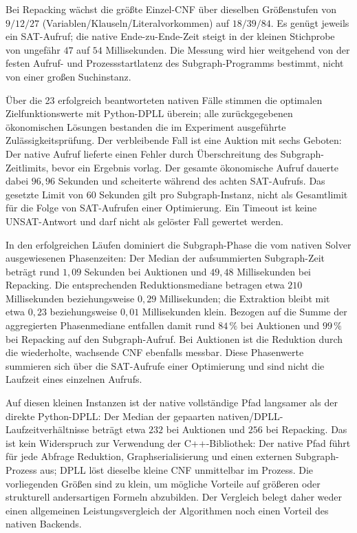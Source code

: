 \documentclass[a4paper,12pt]{article}
\theoremstyle{definition}
\begin{document}
Bei Repacking wächst die größte Einzel-CNF über dieselben Größenstufen von \(9/12/27\) (Variablen/Klauseln/Literalvorkommen) auf \(18/39/84\). Es genügt jeweils ein SAT-Aufruf; die native Ende-zu-Ende-Zeit steigt in der kleinen Stichprobe von ungefähr \(47\) auf \(54\) Millisekunden. Die Messung wird hier weitgehend von der festen Aufruf- und Prozessstartlatenz des Subgraph-Programms bestimmt, nicht von einer großen Suchinstanz.

Über die 23 erfolgreich beantworteten nativen Fälle stimmen die optimalen Zielfunktionswerte mit Python-DPLL überein; alle zurückgegebenen ökonomischen Lösungen bestanden die im Experiment ausgeführte Zulässigkeitsprüfung. Der verbleibende Fall ist eine Auktion mit sechs Geboten: Der native Aufruf lieferte einen Fehler durch Überschreitung des Subgraph-Zeitlimits, bevor ein Ergebnis vorlag. Der gesamte ökonomische Aufruf dauerte dabei \(96{,}96\) Sekunden und scheiterte während des achten SAT-Aufrufs. Das gesetzte Limit von 60 Sekunden gilt pro Subgraph-Instanz, nicht als Gesamtlimit für die Folge von SAT-Aufrufen einer Optimierung. Ein Timeout ist keine UNSAT-Antwort und darf nicht als gelöster Fall gewertet werden.

In den erfolgreichen Läufen dominiert die Subgraph-Phase die vom nativen Solver ausgewiesenen Phasenzeiten: Der Median der aufsummierten Subgraph-Zeit beträgt rund \(1{,}09\) Sekunden bei Auktionen und \(49{,}48\) Millisekunden bei Repacking. Die entsprechenden Reduktionsmediane betragen etwa \(210\) Millisekunden beziehungsweise \(0{,}29\) Millisekunden; die Extraktion bleibt mit etwa \(0{,}23\) beziehungsweise \(0{,}01\) Millisekunden klein. Bezogen auf die Summe der aggregierten Phasenmediane entfallen damit rund \(84\,\%\) bei Auktionen und \(99\,\%\) bei Repacking auf den Subgraph-Aufruf. Bei Auktionen ist die Reduktion durch die wiederholte, wachsende CNF ebenfalls messbar. Diese Phasenwerte summieren sich über die SAT-Aufrufe einer Optimierung und sind nicht die Laufzeit eines einzelnen Aufrufs.

Auf diesen kleinen Instanzen ist der native vollständige Pfad langsamer als der direkte Python-DPLL: Der Median der gepaarten nativen/DPLL-Laufzeitverhältnisse beträgt etwa \(232\) bei Auktionen und \(256\) bei Repacking. Das ist kein Widerspruch zur Verwendung der C++-Bibliothek: Der native Pfad führt für jede Abfrage Reduktion, Graphserialisierung und einen externen Subgraph-Prozess aus; DPLL löst dieselbe kleine CNF unmittelbar im Prozess. Die vorliegenden Größen sind zu klein, um mögliche Vorteile auf größeren oder strukturell andersartigen Formeln abzubilden. Der Vergleich belegt daher weder einen allgemeinen Leistungsvergleich der Algorithmen noch einen Vorteil des nativen Backends.
\end{document}
